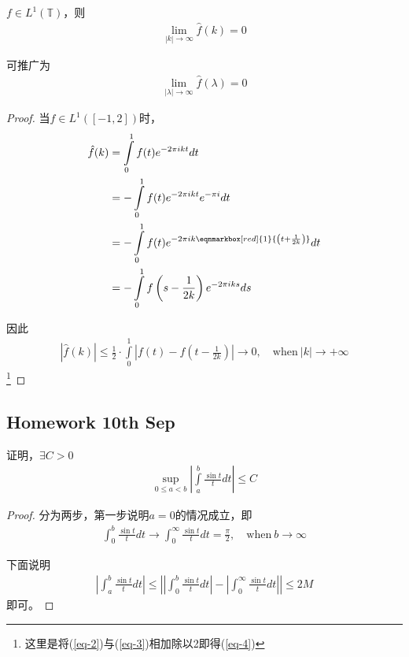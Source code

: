 \begin{theorem}\label{tho-4}
   $f\in L^1(\mathbb{T})$，则
   \begin{align*}
       \lim\limits_{|k|\to\infty} \hat{f}(k) = 0
   \end{align*}

   可推广为
   \begin{align*}
       \lim\limits_{|\lambda|\to\infty} \hat{f}(\lambda) = 0
   \end{align*}
\end{theorem}
\begin{proof}
    当$f\in L^1([-1,2])$时，
    \begin{align}
        \hat{f}(k) &= \int\limits_0^1 f(t) e^{-2\pi ikt} dt \label{eq-2} \\
        &= -\int\limits_0^1 f(t) e^{-2\pi i kt} e^{-\pi i} dt \nonumber \\
        &= -\int\limits_0^1 f(t) e^{-2\pi ik\eqnmarkbox[red]{1}{\left(t + \frac{1}{2k}\right)}}dt \nonumber \\
        & = -\int\limits_{0}^1 f\left(s - \frac{1}{2k}\right) e^{-2\pi i ks}ds \label{eq-3}
    \end{align}

    因此
    \begin{align}
        |\hat{f}(k)| \leqslant \frac{1}{2} \cdot \int\limits_0^1 \left|  f(t) - f\left(t - \frac{1}{2k}\right) \right| \to 0,\quad \text{when}\ |k|\to + \infty \label{eq-4}
    \end{align}\footnote{这里是将(\ref{eq-2})与(\ref{eq-3})相加除以2即得(\ref{eq-4})}
\end{proof}


\subsection*{Homework 10th Sep}
\begin{example}
    证明，$\exists C > 0$
    \begin{align*}
        \sup\limits_{0\leqslant a< b} \left|\int\limits_a^b \frac{\sin t}{t} dt \right| \leqslant C
    \end{align*}
\end{example}
\begin{proof}
    分为两步，第一步说明$a=0$的情况成立，即
    \begin{align*}
        \int_0^b \frac{\sin t}{t} dt\to \int_0^{\infty} \frac{\sin t}{t}dt = \frac{\pi}{2},\quad \text{when}\ b \to \infty
    \end{align*}

    下面说明
    \begin{align*}
        \left|\int_a^b \frac{\sin t}{t}dt \right| \leqslant \left|\left|\int_0^b \frac{\sin t}{t}dt\right| - \left|\int_0^{\infty} \frac{\sin t}{t} dt \right|  \right| \leqslant 2M
    \end{align*}
    即可。
\end{proof}

